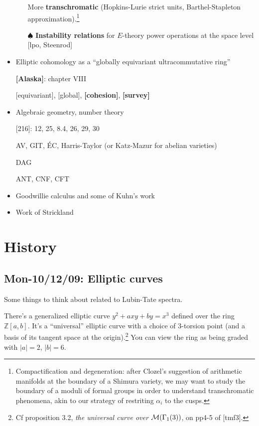 \documentclass{rs}
\theoremstyle{definition}
\theoremstyle{remark}
\newcommand{\mb}[1]{\mathbb{#1}}
\newcommand{\CM}{{\cal M}}
\newcommand{\BZ}{{\mb Z}}
\newcommand{\A}{\alpha}
\newcommand{\todo}{\spadesuit}
\renewcommand{\=}{\approx}
\renewcommand{\-}{\sim}
\numberwithin{equation}{section}
\numberwithin{thm}{section}
\begin{document}
\begin{itemize}
\begin{itemize}
  More \textbf{transchromatic} (Hopkins-Lurie strict units, Barthel-Stapleton approximation).\footnote{Compactification and degeneration: after Clozel's 
  suggestion of arithmetic manifolds at the boundary of a Shimura variety, we may want to study the boundary of a moduli of formal groups 
  in order to understand transchromatic phenomena, akin to our strategy of restriting $\A_i$ to the cusps.}  

  \item [$\todo$] {\bf Instability relations} for $E$-theory power operations at the space level [lpo, Steenrod] 
 \end{itemize}

 \item Elliptic cohomology as a ``globally equivariant ultracommutative ring'' 

 \textbf{[Alaska]}: chapter VIII 

 [equivariant], [global], \textbf{[cohesion]}, \textbf{[survey]} 

 \item Algebraic geometry, number theory 

 {[216]}: 12, 25, 8.4, 26, 29, 30 

 AV, GIT, \'EC, Harris-Taylor (or Katz-Mazur for abelian varieties) 

 DAG 

 ANT, CNF, CFT 

 \item Goodwillie calculus and some of Kuhn's work 

 \item Work of Strickland 
\end{itemize}


\newpage
\section{History}
\subsection{Mon-10/12/09: Elliptic curves}
\label{subsec:history}

Some things to think about related to Lubin-Tate spectra.

There's a generalized elliptic curve $y^2 + axy + by = x^3$ defined over
the ring $\BZ[a,b]$.  It's a ``universal'' elliptic curve with a choice of
3-torsion point (and a basis of its tangent space at the origin).\footnote{Cf proposition 3.2, {\em the universal curve over} $\CM(\Gamma_1(3))$, on pp4-5 of [tmf3].  }  You
can view the ring as being graded with $|a| = 2$, $|b| = 6$.
\end{document}
